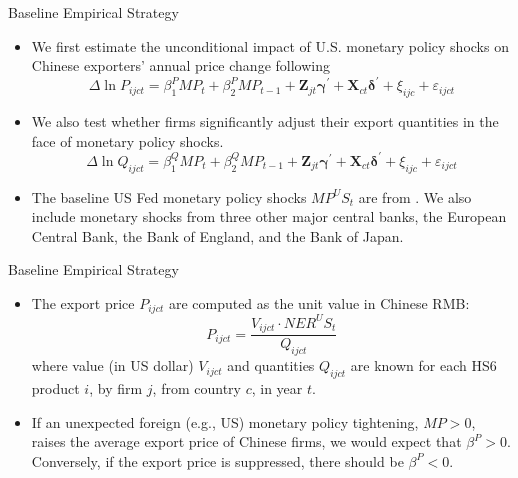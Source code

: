 \documentclass[10pt]{beamer}
\begin{document}
\begin{frame}{Baseline Empirical Strategy}
    \begin{itemize}
        \item We first estimate the unconditional impact of U.S. monetary policy shocks on Chinese exporters' annual price change following \cite{di}
        \begin{equation}
	   \Delta \ln P_{i j c t}=\beta^P_1 M P_{t} + \beta^P_2 M P_{t-1}+ \mathbf{Z}_{jt} \boldsymbol{\gamma}^{\prime}+\mathbf{X}_{ct} \boldsymbol{\delta}^{\prime} +\xi_{i j c} + \varepsilon_{ijct}
	\label{eq.baseline}
        \end{equation}
        \item We also test whether firms significantly adjust their export quantities in the face of monetary policy shocks.
        \begin{equation}
	   \Delta \ln Q_{i j c t}=\beta^Q_1 M P_{t} + \beta^Q_2 M P_{t-1}+ \mathbf{Z}_{jt} \boldsymbol{\gamma}^{\prime}+\mathbf{X}_{ct} \boldsymbol{\delta}^{\prime} +\xi_{i j c} + \varepsilon_{ijct}
	\label{eq.quantity}
        \end{equation}
        \item The baseline US Fed monetary policy shocks $MP^US_t$ are from \cite{brw2021}. We also include monetary shocks from three other major central banks, the European Central Bank, the Bank of England, and the Bank of Japan.
    \end{itemize}
\end{frame}

\begin{frame}{Baseline Empirical Strategy}
    \begin{itemize} 
        \item The export price $P_{i j c t}$ are computed as the unit value in Chinese RMB:
    		$$
    		P_{ijct}=\frac{V_{ijct}\cdot NER^US_{t}}{Q_{ijct}}
    		$$
            where value (in US dollar) $V_{ijct}$ and quantities $Q_{ijct}$ are known for each HS6 product $i$, by firm $j$, from country $c$, in year $t$.
        \item If an unexpected foreign (e.g., US) monetary policy tightening, $MP > 0$, raises the average export price of Chinese firms, we would expect that $ \beta^P > 0$. Conversely, if the export price is suppressed, there should be $ \beta^P < 0$.
    \end{itemize}
\end{frame}
\end{document}

